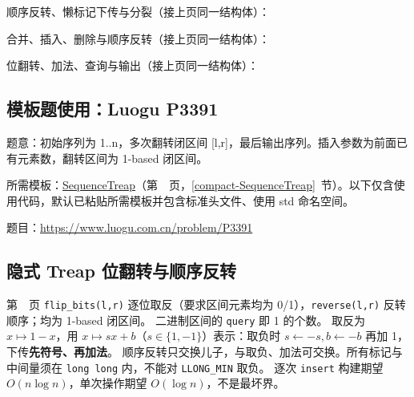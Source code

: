 \Needspace{598pt}



\newpage

\noindent 顺序反转、懒标记下传与分裂（接上页同一结构体）：



\newpage

\noindent 合并、插入、删除与顺序反转（接上页同一结构体）：



\newpage

\noindent 位翻转、加法、查询与输出（接上页同一结构体）：



\Needspace{348pt}

\subsection*{模板题使用：Luogu P3391}

\label{usage-example-10}

题意：初始序列为 1..n，多次翻转闭区间 [l,r]，最后输出序列。插入参数为前面已有元素数，翻转区间为 1-based 闭区间。

所需模板：\hyperref[compact-SequenceTreap]{SequenceTreap}（第~\pageref{compact-SequenceTreap}~页，\ref{compact-SequenceTreap}~节）。以下仅含使用代码，默认已粘贴所需模板并包含标准头文件、使用 std 命名空间。

题目：\url{https://www.luogu.com.cn/problem/P3391}



\subsection{隐式 Treap 位翻转与顺序反转}\label{knowledge-treap-flip}
第~\pageref{compact-SequenceTreap}~页 \texttt{flip\_bits(l,r)} 逐位取反（要求区间元素均为 0/1），\texttt{reverse(l,r)} 反转顺序；均为 1-based 闭区间。
二进制区间的 \texttt{query} 即 1 的个数。
取反为 $x\mapsto1-x$，用 $x\mapsto sx+b$（$s\in\{1,-1\}$）表示：取负时 $s\gets-s,b\gets-b$ 再加 1，下传\textbf{先符号、再加法}。
顺序反转只交换儿子，与取负、加法可交换。所有标记与中间量须在 \texttt{long long} 内，不能对 \texttt{LLONG\_MIN} 取负。
逐次 \texttt{insert} 构建期望 $O(n\log n)$，单次操作期望 $O(\log n)$，不是最坏界。



